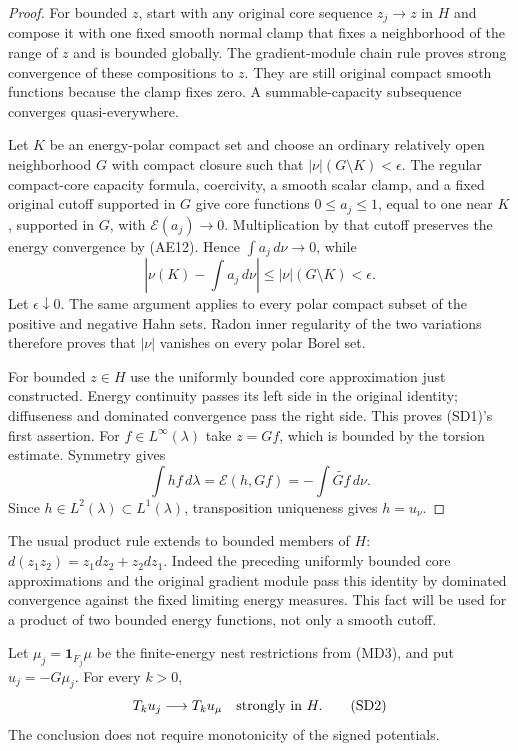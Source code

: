 \begin{proof}
For bounded $z$, start with any original core sequence $z_j\to z$
in $H$ and compose it with one fixed smooth normal clamp that
fixes a neighborhood of the range of $z$ and is bounded globally.
The gradient-module chain rule proves strong convergence of these
compositions to $z$.  They are still original compact smooth
functions because the clamp fixes zero.  A summable-capacity
subsequence converges quasi-everywhere.

Let $K$ be an energy-polar compact set and choose an ordinary
relatively open neighborhood $G$ with compact closure such that
$|\nu|(G\setminus K)<\epsilon$.
The regular compact-core capacity formula, coercivity, a smooth
scalar clamp, and a fixed original cutoff supported in $G$
give core functions $0\le a_j\le1$, equal to one near $K$,
supported in $G$, with $\mathcal E(a_j)\to0$.
Multiplication by that cutoff preserves the energy convergence
by (AE12).  Hence $\int a_j\,d\nu\to0$, while
\[
       \left|\nu(K)-\int a_j\,d\nu\right|
                            \le |\nu|(G\setminus K)<\epsilon.
\]
Let $\epsilon\downarrow0$.  The same argument applies to every
polar compact subset of the positive and negative Hahn sets.
Radon inner regularity of the two variations therefore proves
that $|\nu|$ vanishes on every polar Borel set.

For bounded $z\in H$ use the uniformly bounded core
approximation just constructed.  Energy continuity passes its
left side in the original identity; diffuseness and dominated
convergence pass the right side.  This proves (SD1)'s first
assertion.  For $f\in L^\infty(\lambda)$ take $z=Gf$, which
is bounded by the torsion estimate.  Symmetry gives
\[
 \int h f\,d\lambda=\mathcal E(h,Gf)
                         =-\int\widetilde{Gf}\,d\nu.
\]
Since $h\in L^2(\lambda)\subset L^1(\lambda)$, transposition
uniqueness gives $h=u_\nu$.
\end{proof}

The usual product rule extends to bounded members of $H$:
$d(z_1z_2)=z_1dz_2+z_2dz_1$.  Indeed the preceding uniformly bounded
core approximations and the original gradient module pass this
identity by dominated convergence against the fixed limiting
energy measures.  This fact will be used for a product of two
bounded energy functions, not only a smooth cutoff.

\begin{theorem}
\label{thm:r11-signed-strong-truncations}
Let $\mu_j=\mathbf1_{F_j}\mu$ be the finite-energy nest
restrictions from (MD3), and put $u_j=-G\mu_j$.
For every $k>0$,
\[
                          T_ku_j\longrightarrow T_ku_\mu
                                      \quad\hbox{strongly in }H.
 \tag{SD2}
\]
The conclusion does not require monotonicity of the signed
potentials.
\end{theorem}

